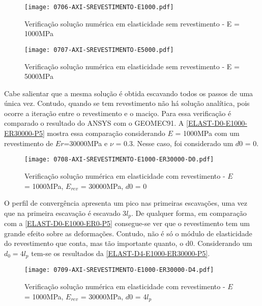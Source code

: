 \begin{figure}[H]
	\begin{center}
		\texttt{[image: 0706-AXI-SREVESTIMENTO-E1000.pdf]}
	\end{center}
	\caption{\label{ELAST-D0-E1000-ER0-P5}Verificação solução numérica em elasticidade sem revestimento - E = 1000MPa}
\end{figure}

\begin{figure}[H]
	\begin{center}
		\texttt{[image: 0707-AXI-SREVESTIMENTO-E5000.pdf]}
	\end{center}
	\caption{\label{ELAST-D0-E5000-ER0-P5}Verificação solução numérica em elasticidade sem revestimento - E = 5000MPa}
\end{figure}

Cabe salientar que a mesma solução é obtida escavando todos os passos de uma única vez. Contudo, quando se tem revestimento não há solução analítica, pois ocorre a iteração entre o revestimento e o maciço. Para essa verificação é comparado o resultado do ANSYS com o GEOMEC91. A \autoref{ELAST-D0-E1000-ER30000-P5} mostra essa comparação considerando $E$ = 1000MPa com um revestimento de $Er$=30000MPa e $\nu$ = 0.3. Nesse caso, foi considerado um $d0$ = 0.

\begin{figure}[H]
	\begin{center}
		\texttt{[image: 0708-AXI-SREVESTIMENTO-E1000-ER30000-D0.pdf]}
	\end{center}
	\caption{\label{ELAST-D0-E1000-ER30000-P5}Verificação solução numérica em elasticidade com revestimento - $E$ = 1000MPa, $E_{rev}$ = 30000MPa, $d0$ = 0}
\end{figure}

O perfil de convergência apresenta um pico nas primeiras escavações, uma vez que na primeira escavação é escavado 3$l_p$. De qualquer forma, em comparação com a \autoref{ELAST-D0-E1000-ER0-P5} consegue-se ver que o revestimento tem um grande efeito sobre as deformações. Contudo, não é só o módulo de elasticidade do revestimento que conta, mas tão importante quanto, o d0. Considerando um $d_0=4l_p$ tem-se os resultados da \autoref{ELAST-D4-E1000-ER30000-P5}.

\begin{figure}[H]
	\begin{center}
		\texttt{[image: 0709-AXI-SREVESTIMENTO-E1000-ER30000-D4.pdf]}
	\end{center}
	\caption{\label{ELAST-D4-E1000-ER30000-P5}Verificação solução numérica em elasticidade com revestimento - $E$ = 1000MPa, $E_{rev}$ = 30000MPa, $d0$ = 4$l_p$}
\end{figure}

